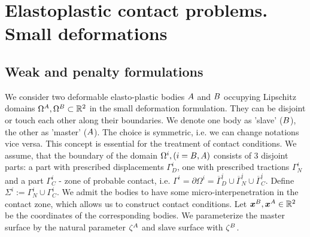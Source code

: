 \documentclass[12pt,a4paper]{scrbook}
\begin{document}
\def \IABEM{/home/gein/Documents/tex/papers/IABEM06}
\def \SimulationDataOne{/home/gein/Documents/tex/Draft/contact.BEMBEM.vs.FEMFEM/SimulationData/test.plasticity.check.21.07.2006.test.bembem.nofriction.18.07.2006}
\def \pict{/home/gein/Documents/tex/papers/paper_FE.BE.Procedures.for.Elastoplastic.Contact.Problems_CGMS/pict}
\def \pictnew{/home/gein/Documents/tex/papers/paper_FE.BE.Procedures.for.Elastoplastic.Contact.Problems_CGMS/pict_new}
\def \DomainDecomposition{/home/gein/Documents/tex/papers/paper_Domain.Decomposition.FE.BE.Techniques.for.Elastoplastic.Contact.Problems_CGMS}
\chapter{Elastoplastic contact problems. Small deformations}\label{chap:SmallDeformations}
\section{Weak and penalty formulations}\label{sec:ElPlContact:WeakPenalty}

We consider two deformable elasto-plastic bodies $\ms$ and $\sl$ occupying Lipschitz domains $\Omega^{\ms}, \Omega^{\sl} \subset \R^2$  in the small deformation formulation. They can be disjoint or touch each other along their boundaries. We denote one body as 'slave' ($\sl$), the other as 'master' ($\ms$). The choice is symmetric, i.e. we can change notations vice versa. This concept is essential for the treatment of contact conditions. We assume, that the boundary of the domain $\Omega^i, (i=\sl,\ms)$  consists of 3 disjoint parts: a part with prescribed displacements $\Gamma^i_D$, one with prescribed tractions $\Gamma^i_N$ and a part $\Gamma^i_C$ - zone of probable contact, i.e. $\Gamma^i = \partial \Omega^i = \overline{\Gamma}^i_D \cup \overline{\Gamma}^i_N \cup \overline{\Gamma}^i_C$. Define $\Sigma^i := \Gamma^i_N \cup \Gamma^i_C$. We admit the bodies to have some micro-interpenetration in the contact zone, which allows us to construct contact conditions. Let $\bv{x}^{\sl}, \bv{x}^{\ms} \in \R^2$ be the coordinates of the corresponding bodies. We parameterize the master surface by the natural parameter $\zeta^{\ms}$ and slave surface with $\zeta^{\sl}$.
\end{document}
